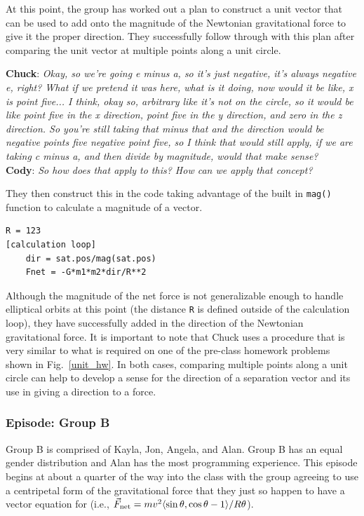 \documentclass{msuphddissertation}
\begin{document}
\begin{doublespace}
At this point, the group has worked out a plan to construct a unit vector that can be used to add onto the magnitude of the Newtonian gravitational force to give it the proper direction.  They successfully follow through with this plan after comparing the unit vector at multiple points along a unit circle.

\vspace*{4pt}
\noindent\textbf{Chuck}: {\it Okay, so we're going e minus a, so it's just negative, it's always negative e, right?  What if we pretend it was here, what is it doing, now would it be like, x is point five... I think, okay so, arbitrary like it's not on the circle, so it would be like point five in the x direction, point five in the y direction, and zero in the z direction.  So you're still taking that minus that and the direction would be negative points five negative point five, so I think that would still apply, if we are taking c minus a, and then divide by magnitude, would that make sense?}
\\\textbf{Cody}: {\it So how does that apply to this? How can we apply that concept?}
\vspace*{4pt}

They then construct this in the code taking advantage of the built in \texttt{mag()} function to calculate a magnitude of a vector.\begin{lstlisting}
R = 123
[calculation loop]
    dir = sat.pos/mag(sat.pos)
    Fnet = -G*m1*m2*dir/R**2
\end{lstlisting}

Although the magnitude of the net force is not generalizable enough to handle elliptical orbits at this point (the distance \texttt{R} is defined outside of the calculation loop), they have successfully added in the direction of the Newtonian gravitational force.  It is important to note that Chuck uses a procedure that is very similar to what is required on one of the pre-class homework problems shown in Fig.~\ref{unit_hw}.  In both cases, comparing multiple points along a unit circle can help to develop a sense for the direction of a separation vector and its use in giving a direction to a force.

%
%

\subsubsection{Episode: Group B}

Group B is comprised of Kayla, Jon, Angela, and Alan.  Group B has an equal gender distribution and Alan has the most programming experience.  This episode begins at about a quarter of the way into the class with the group agreeing to use a centripetal form of the gravitational force that they just so happen to have a vector equation for (i.e., $\vec{F}_{\rm net}=mv^{2}\langle\sin\theta,\cos\theta-1\rangle/R\theta$).


\end{doublespace}
\end{document}
